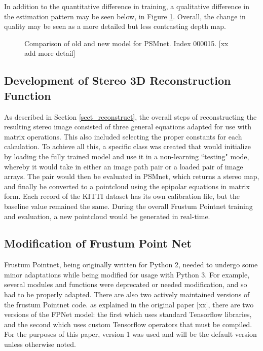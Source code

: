 In addition to the quantitative difference in training, a qualitative difference in the estimation pattern may be seen below, in Figure \ref{new_psmnet}. Overall, the change in quality may be seen as a more detailed but less contrasting depth map.

\begin{figure}[H]
    \centering
    \caption{Comparison of old and new model for PSMnet. Index 000015. [xx add more detail]}
    \label{new_psmnet}
\end{figure}



\subsection{Development of Stereo 3D Reconstruction Function}
As described in Section \ref{sect_reconstruct}, the overall steps of reconstructing the resulting stereo image consisted of three general equations adapted for use with matrix operations. This also included selecting the proper constants for each calculation. To achieve all this, a specific class was created that would initialize by loading the fully trained model and use it in a non-learning ``testing" mode, whereby it would take in either an image path pair or a loaded pair of image arrays. The pair would then be evaluated in PSMnet, which returns a stereo map, and finally be converted to a pointcloud using the epipolar equations in matrix form. Each record of the KITTI dataset has its own calibration file, but the baseline value remained the same. During the overall Frustum Pointnet training and evaluation, a new pointcloud would be generated in real-time.

\subsection{Modification of Frustum Point Net}
Frustum Pointnet, being originally written for Python 2, needed to undergo some minor adaptations while being modified for usage with Python 3. For example, several modules and functions were deprecated or needed modification, and so had to be properly adapted. There are also two actively maintained versions of the frustum Pointnet code. as explained in the original paper [xx], there are two versions of the FPNet model: the first which uses standard Tensorflow libraries, and the second which uses custom Tensorflow operators that must be compiled. For the purposes of this paper, version 1 was used and will be the default version unless otherwise noted.

